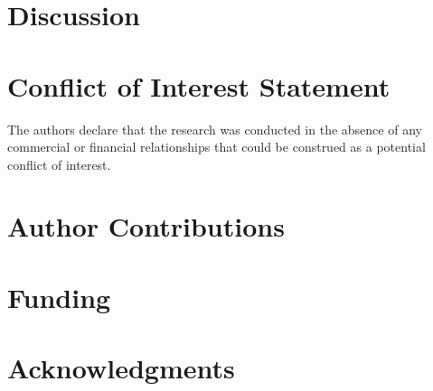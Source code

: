 \documentclass[utf8]{article}
\begin{document}
\section*{Discussion} 






\section*{Conflict of Interest Statement}
The authors declare that the research was conducted in the absence of any commercial or financial relationships that could be construed as a potential conflict of interest.

\section*{Author Contributions}

\section*{Funding}

\section*{Acknowledgments}
\end{document}
